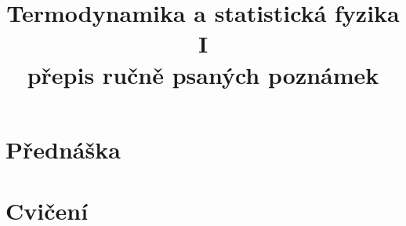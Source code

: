 \documentclass[11pt,a4paper]{article}
\title{\color{hlavni}Termodynamika a statistická fyzika I\\[2pt]\large přepis ručně psaných poznámek}
\date{}
\begin{document}
\maketitle
\tableofcontents
\newpage

\part{Přednáška}

\newpage

\newpage

\newpage

\newpage

\newpage

\newpage

\newpage

\newpage

\newpage

\newpage

\newpage

\newpage

\newpage

\newpage

\newpage

\newpage

\newpage


\part{Cvičení}

\newpage

\newpage

\newpage

\newpage

\newpage

\newpage

\newpage

\newpage

\newpage

\newpage

\newpage

\newpage

\newpage

\newpage

\end{document}

